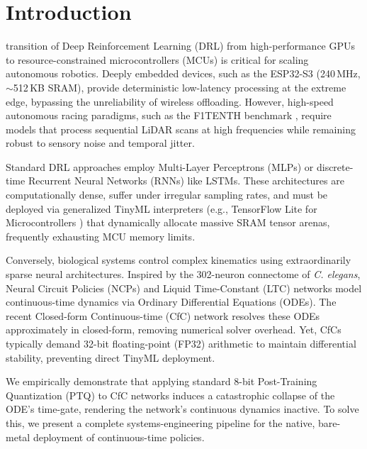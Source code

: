 \documentclass[lettersize,journal]{IEEEtran}
\begin{document}
\section{Introduction}
 transition of Deep Reinforcement Learning (DRL) from high-performance GPUs to resource-constrained microcontrollers (MCUs) is critical for scaling autonomous robotics. Deeply embedded devices, such as the ESP32-S3 (240\,MHz, $\sim$512\,KB SRAM), provide deterministic low-latency processing at the extreme edge, bypassing the unreliability of wireless offloading. However, high-speed autonomous racing paradigms, such as the F1TENTH benchmark \cite{okelly2020f1tenth}, require models that process sequential LiDAR scans at high frequencies while remaining robust to sensory noise and temporal jitter.

Standard DRL approaches employ Multi-Layer Perceptrons (MLPs) or discrete-time Recurrent Neural Networks (RNNs) like LSTMs. These architectures are computationally dense, suffer under irregular sampling rates, and must be deployed via generalized TinyML interpreters (e.g., TensorFlow Lite for Microcontrollers \cite{david2021tensorflow}) that dynamically allocate massive SRAM tensor arenas, frequently exhausting MCU memory limits.

Conversely, biological systems control complex kinematics using extraordinarily sparse neural architectures. Inspired by the 302-neuron connectome of \textit{C. elegans}, Neural Circuit Policies (NCPs) \cite{lechner2020neural} and Liquid Time-Constant (LTC) networks \cite{hasani2021liquid} model continuous-time dynamics via Ordinary Differential Equations (ODEs). The recent Closed-form Continuous-time (CfC) network \cite{hasani2022closed} resolves these ODEs approximately in closed-form, removing numerical solver overhead. Yet, CfCs typically demand 32-bit floating-point (FP32) arithmetic to maintain differential stability, preventing direct TinyML deployment.

We empirically demonstrate that applying standard 8-bit Post-Training Quantization (PTQ) to CfC networks induces a catastrophic collapse of the ODE's time-gate, rendering the network's continuous dynamics inactive. To solve this, we present a complete systems-engineering pipeline for the native, bare-metal deployment of continuous-time policies.
\end{document}

